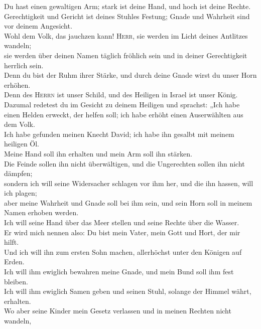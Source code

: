  Du hast einen gewaltigen Arm; stark ist deine Hand, und
hoch ist deine Rechte.\\
 Gerechtigkeit und Gericht ist deines Stuhles Festung;
Gnade und Wahrheit sind vor deinem Angesicht.\\
 Wohl dem Volk, das jauchzen kann! \textsc{Herr}, sie
werden im Licht deines Antlitzes wandeln;\\
 sie werden über deinen Namen täglich fröhlich sein und
in deiner Gerechtigkeit herrlich sein.\\
 Denn du bist der Ruhm ihrer Stärke, und durch deine
Gnade wirst du unser Horn erhöhen.\\
 Denn des \textsc{Herrn} ist unser Schild, und des
Heiligen in Israel ist unser König.\\
 Dazumal redetest du im Gesicht zu deinem Heiligen und
sprachst: „Ich habe einen Helden erweckt, der helfen soll; ich habe
erhöht einen Auserwählten aus dem Volk.\\
 Ich habe gefunden meinen Knecht David; ich habe ihn
gesalbt mit meinem heiligen Öl.\\
 Meine Hand soll ihn erhalten und mein Arm soll ihn
stärken.\\
 Die Feinde sollen ihn nicht überwältigen, und die
Ungerechten sollen ihn nicht dämpfen;\\
 sondern ich will seine Widersacher schlagen vor ihm her,
und die ihn hassen, will ich plagen;\\
 aber meine Wahrheit und Gnade soll bei ihm sein, und
sein Horn soll in meinem Namen erhoben werden.\\
 Ich will seine Hand über das Meer stellen und seine
Rechte über die Wasser.\\
 Er wird mich nennen also: Du bist mein Vater, mein Gott
und Hort, der mir hilft.\\
 Und ich will ihn zum ersten Sohn machen, allerhöchst
unter den Königen auf Erden.\\
 Ich will ihm ewiglich bewahren meine Gnade, und mein
Bund soll ihm fest bleiben.\\
 Ich will ihm ewiglich Samen geben und seinen Stuhl,
solange der Himmel währt, erhalten.\\
 Wo aber seine Kinder mein Gesetz verlassen und in meinen
Rechten nicht wandeln,\\
